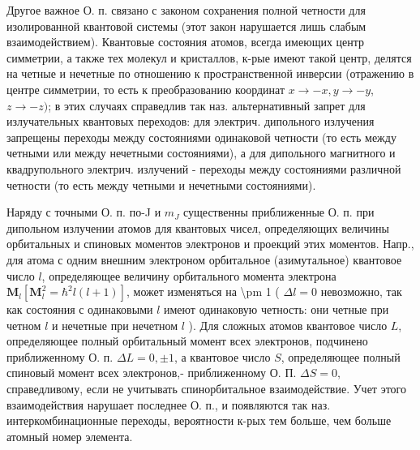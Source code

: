 \documentclass[10pt]{article}
\begin{document}
Другое важное О. п. связано с законом сохранения полной четности для изолированной квантовой системы (этот закон нарушается лишь слабым взаимодействием). Квантовые состояния атомов, всегда имеющих центр симметрии, а также тех молекул и кристаллов, к-рые имеют такой центр, делятся на четные и нечетные по отношению к пространственной инверсии (отражению в центре симметрии, то есть к преобразованию координат $x \rightarrow-x, y \rightarrow-y$, $z \rightarrow-z)$; в этих случаях справедлив так наз. альтернативный запрет для излучательных квантовых переходов: для электрич. дипольного излучения запрещены переходы между состояниями одинаковой четности (то есть между четными или между нечетными состояниями), а для дипольного магнитного и квадрупольного электрич. излучений - переходы между состояниями различной четности (то есть между четными и нечетными состояниями).



Наряду с точными О. п. по-J и $m_{J}$ существенны приближенные О. п. при дипольном излучении атомов для квантовых чисел, определяющих величины орбитальных и спиновых моментов электронов и проекций этих моментов. Напр., для атома с одним внешним электроном орбитальное (азимутальное) квантовое число $l$, определяющее величину орбитального момента электрона $\boldsymbol{M}_{l}\left[\boldsymbol{M}_{l}^{2}=\hbar^{2} l(l+1)\right]$, может изменяться на \textbackslash pm 1 ( $\Delta l=0$ невозможно, так как состояния с одинаковыми $l$ имеют одинаковую четность: они четные при четном $l$ и нечетные при нечетном $l$ ). Для сложных атомов квантовое число $L$, определяющее полный орбитальный момент всех электронов, подчинено приближенному О. п. $\Delta L=0, \pm 1$, а квантовое число $S$, определяющее полный спиновый момент всех электронов,- приближенному О. П. $\Delta S=0$, справедливому, если не учитывать спинорбитальное взаимодействие. Учет этого взаимодействия нарушает последнее О. п., и появляются так наз. интеркомбинационные переходы, вероятности к-рых тем больше, чем больше атомный номер элемента.
\end{document}
